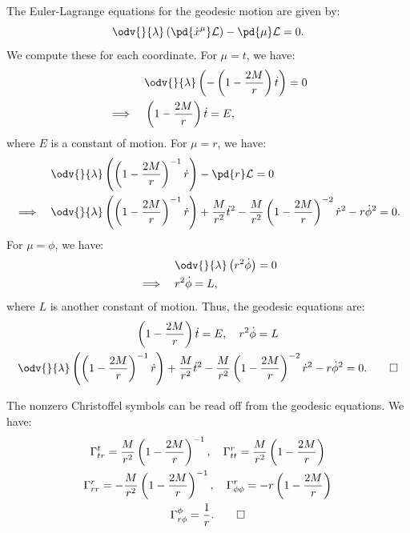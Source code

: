 \begin{solution}[(ii)]
  The Euler-Lagrange equations for the geodesic motion are given by:
  \[%
    \odv{}{\lambda} \left(\pd{\dot{x}^\mu}\L\right) - \pd{\mu}\L = 0
  .\]%
  We compute these for each coordinate. For $\mu = t$, we have:
  \begin{align*}
    &\quad\odv{}{\lambda} \left(-\left(1 - \frac{2M}{r}\right) \dot{t}\right) = 0 \\
    \implies&\quad \left(1 - \frac{2M}{r}\right) \dot{t} = E
  ,\end{align*}
  where $E$ is a constant of motion. For $\mu = r$, we have:
  \begin{align*}
    &\quad\odv{}{\lambda} \left(\left(1 - \frac{2M}{r}\right)^{-1} \dot{r}\right) - \pd{r}\L = 0 \\
    \implies&\quad \odv{}{\lambda} \left(\left(1 - \frac{2M}{r}\right)^{-1} \dot{r}\right) + \frac{M}{r^2} \dot{t}^2 - \frac{M}{r^2} \left(1 - \frac{2M}{r}\right)^{-2} \dot{r}^2 - r \dot{\phi}^2 = 0
  .\end{align*}
  For $\mu = \phi$, we have:
  \begin{align*}
    &\quad\odv{}{\lambda} \left(r^2 \dot{\phi}\right) = 0 \\
    \implies&\quad r^2 \dot{\phi} = L
  ,\end{align*}
  where $L$ is another constant of motion. Thus, the geodesic equations are:
  \begin{gather*}
    \left(1 - \frac{2M}{r}\right) \dot{t} = E, \quad r^2 \dot{\phi} = L \\
    \odv{}{\lambda} \left(\left(1 - \frac{2M}{r}\right)^{-1} \dot{r}\right) + \frac{M}{r^2} \dot{t}^2 - \frac{M}{r^2} \left(1 - \frac{2M}{r}\right)^{-2} \dot{r}^2 - r \dot{\phi}^2 = 0
  .\qedhere\end{gather*}
\end{solution}

\begin{solution}[(iii)]
  The nonzero Christoffel symbols can be read off from the geodesic equations. We have:
  \begin{gather*}
    \Gamma^t_{tr} = \frac{M}{r^2} \left(1 - \frac{2M}{r}\right)^{-1}, \quad \Gamma_{tt}^r = \frac{M}{r^2} \left(1 - \frac{2M}{r}\right) \\
    \Gamma^r_{rr} = -\frac{M}{r^2} \left(1 - \frac{2M}{r}\right)^{-1}, \quad \Gamma^r_{\phi\phi} = -r \left(1 - \frac{2M}{r}\right) \\
    \Gamma^\phi_{r\phi} = \frac{1}{r}
  .\qedhere\end{gather*}
\end{solution}

